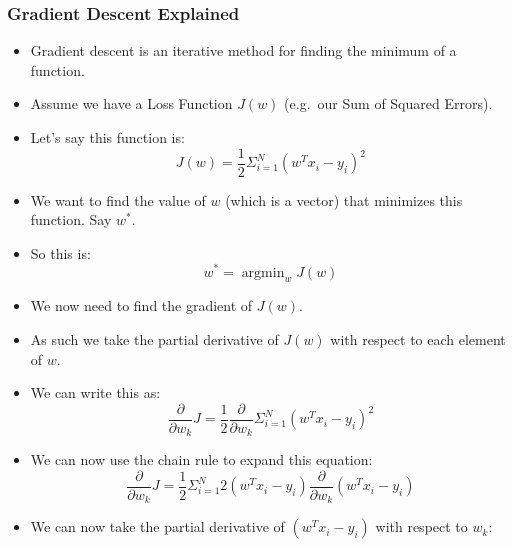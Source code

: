 \documentclass[12pt]{article}
\DeclareMathOperator*{\argmin}{argmin}
\begin{document}
\begin{itemize}
                    \subsubsection{Gradient Descent Explained}
                        \begin{itemize}
                            \item Gradient descent is an iterative method for finding the minimum of a function.
                            \item Assume we have a Loss Function $J(w)$ (e.g.\ our Sum of Squared Errors).
                            \item Let's say this function is:
                            \begin{equation}
                                J(w) = \frac{1}{2} \Sigma_{i=1}^N {({w^T}x_i - y_i)}^2
                            \end{equation}
                            \item We want to find the value of $w$ (which is a vector) that minimizes this function. Say $w^*$.
                            \item So this is:
                            \begin{equation}
                                w^* = \argmin_w J(w)
                            \end{equation}
                            \item We now need to find the gradient of $J(w)$.
                            \item As such we take the partial derivative of $J(w)$ with respect to each element of $w$.
                            \item We can write this as:
                            \begin{equation}
                                \frac{\partial}{\partial w_k} J = \frac{1}{2} \frac{\partial}{\partial w_k} \Sigma_{i=1}^N {({w^T}x_i - y_i)}^2
                            \end{equation}
                            \item We can now use the chain rule to expand this equation:
                            \begin{equation}
                                \frac{\partial}{\partial w_k} J = \frac{1}{2} \Sigma_{i=1}^N 2({w^T}x_i - y_i) \frac{\partial}{\partial w_k} ({w^T}x_i - y_i)
                            \end{equation}
                            \item We can now take the partial derivative of $({w^T}x_i - y_i)$ with respect to $w_k$:

\end{itemize}
\end{itemize}
\end{document}
